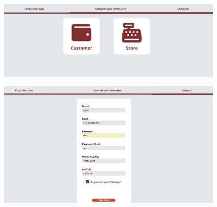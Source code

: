 \documentclass[a4paper, 12pt]{article}
\begin{document}
\begin{figure}[hp]
    \centerline{\includegraphics[width=40em]{gui-snapshot/user/register-customer-1.png}}
    \label{fig:enter-label}
\end{figure}
\begin{figure}[hp]
    \centerline{\includegraphics[width=40em]{gui-snapshot/user/register-customer-2.png}}
    \label{fig:enter-label}
\end{figure}
\newpage
\end{document}
